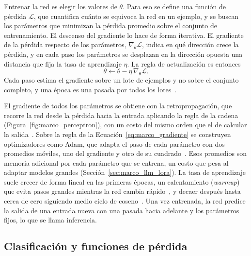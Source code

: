 Entrenar la red es elegir los valores de $\theta$. Para eso se define una función de pérdida $\mathcal{L}$, que
cuantifica cuánto se equivoca la red en un ejemplo, y se buscan los parámetros que minimizan la pérdida promedio
sobre el conjunto de entrenamiento. El descenso del gradiente lo hace de forma iterativa. El gradiente de la
pérdida respecto de los parámetros, $\nabla_{\theta} \mathcal{L}$, indica en qué dirección crece la pérdida, y
en cada paso los parámetros se desplazan en la dirección opuesta una distancia que fija la tasa de aprendizaje
$\eta$. La regla de actualización es entonces
\begin{equation}
    \theta \leftarrow \theta - \eta \, \nabla_{\theta} \mathcal{L}.
    \label{eq:marco_gradiente}
\end{equation}
Cada paso estima el gradiente sobre un lote de ejemplos y no sobre el conjunto completo, y una época es una
pasada por todos los lotes~\cite{goodfellow2016deep}.

El gradiente de todos los parámetros se obtiene con la retropropagación, que recorre la red desde la pérdida
hacia la entrada aplicando la regla de la cadena (Figura~\ref{fig:marco_perceptron}), con un costo del mismo orden que el de calcular la
salida~\cite{rumelhart1986learning}. Sobre la regla de la Ecuación~\ref{eq:marco_gradiente} se construyen
optimizadores como Adam, que adapta el paso de cada parámetro con dos promedios móviles, uno del gradiente y
otro de su cuadrado~\cite{kingma2015adam}. Esos promedios son memoria adicional por cada parámetro que se
entrena, un costo que pesa al adaptar modelos grandes (Sección~\ref{sec:marco_llm_lora}). La tasa de
aprendizaje suele crecer de forma lineal en las primeras épocas, un calentamiento (\emph{warmup}) que evita
pasos grandes mientras la red cambia rápido~\cite{goyal2017accurate}, y decaer después hasta cerca de cero
siguiendo medio ciclo de coseno~\cite{loshchilov2017sgdr}. Una vez entrenada, la red predice la salida de una
entrada nueva con una pasada hacia adelante y los parámetros fijos, lo que se llama inferencia.



\subsection{Clasificación y funciones de pérdida}
\label{sec:marco_softmax}

